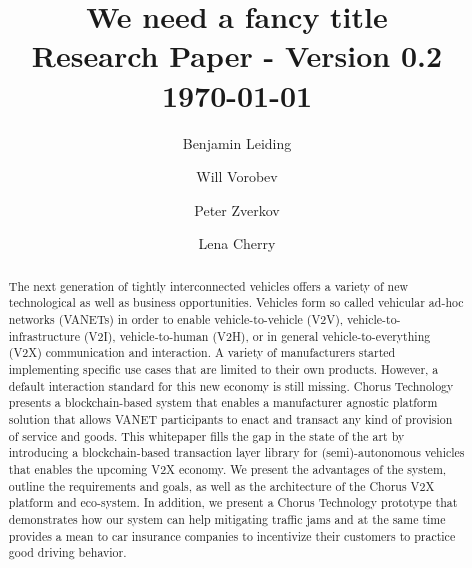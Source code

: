 \documentclass{llncs}
\begin{document}
	{
	\title{We need a fancy title\\ \small Research Paper - Version 0.2\\\small \today}
	
	\author{Benjamin Leiding \and Will Vorobev \and Peter Zverkov \and Lena Cherry}
	
	
	\maketitle


	\begin{abstract}


		The next generation of tightly interconnected vehicles offers a variety of new technological as well as  business opportunities. Vehicles form so called vehicular ad-hoc networks (VANETs) in order to enable vehicle-to-vehicle (V2V), vehicle-to-infrastructure (V2I), vehicle-to-human (V2H), or in general vehicle-to-everything (V2X) communication and interaction. A variety of manufacturers started implementing specific use cases that are limited to their own products. However, a default interaction standard for this new economy is still missing. Chorus Technology presents a blockchain-based system that enables a manufacturer agnostic platform solution that allows VANET participants to enact and transact any kind of provision of service and goods. This whitepaper fills the gap in the state of the art by introducing a blockchain-based transaction layer library for (semi)-autonomous vehicles that enables the upcoming V2X economy. We present the advantages of the system, outline the requirements and goals, as well as the architecture of the Chorus V2X platform and eco-system. In addition, we present a Chorus Technology prototype that demonstrates how our system can help mitigating traffic jams and at the same time provides a mean to car insurance companies to incentivize their customers to practice good driving behavior.
 



\end{abstract}}
\end{document}
